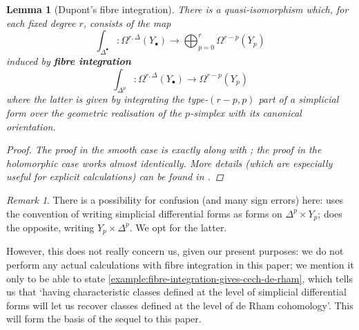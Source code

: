 \documentclass[11pt,fleqn]{article}
\theoremstyle{plain}
\newtheorem{lemma}[theorem]{Lemma}
\theoremstyle{definition}
\theoremstyle{remark}
\newtheorem{remark}[theorem]{Remark}
\numberwithin{equation}{theorem}
\newcommand{\define}[1]{\textbf{#1}}
\begin{document}
        \begin{lemma}[Dupont's fibre integration]\label{lemma:dupont's-fibre-integration}
            There is a \emph{quasi-isomorphism} which, for each fixed degree $r$, consists of the map
            \begin{equation}
                \int_{\Delta^\bullet}\colon \Omega^{r,\Delta}({Y_\bullet})
                \to
                \bigoplus_{p=0}^r\Omega^{r-p}({Y_p})
            \end{equation}
            induced by \define{fibre integration}
            \begin{equation}
                \int_{\Delta^p}\colon\Omega^{r,\Delta}({Y_\bullet})
                \to
                \Omega^{r-p}({Y_p})
            \end{equation}
            where the latter is given by integrating the type-$(r-p,p)$ part of a simplicial form over the geometric realisation of the $p$-simplex with its canonical orientation.
            \begin{proof}
                The proof in the \emph{smooth} case is exactly \cite[Theorem~2.3]{Dupont1976} along with \cite[Remark~1, §2]{Dupont1976}; the proof in the holomorphic case works almost identically.
                More details (which are especially useful for explicit calculations) can be found in \cite{Hosgood2020}.
            \end{proof}
        \end{lemma}

        \begin{remark}
            There is a possibility for confusion (and many sign errors) here: \cite{Dupont1976} uses the convention of writing simplicial differential forms as forms on $\Delta^p\times Y_{p}$; \cite{Green1980} does the opposite, writing $Y_{p}\times\Delta^p$.
            We opt for the latter.

            However, this does not really concern us, given our present purposes: we do not perform any actual calculations with fibre integration in this paper; we mention it only to be able to state \cref{example:fibre-integration-gives-cech-de-rham}, which tells us that `having characteristic classes defined at the level of simplicial differential forms will let us recover classes defined at the level of de Rham cohomology'.
            This will form the basis of the sequel to this paper.
        \end{remark}
\end{document}
